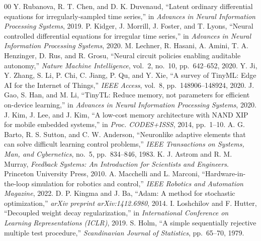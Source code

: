 \documentclass[conference]{IEEEtran}
\begin{document}
\begin{thebibliography}{00}
 Y. Rubanova, R. T. Chen, and D. K. Duvenaud, ``Latent ordinary differential equations for irregularly-sampled time series,'' in \textit{Advances in Neural Information Processing Systems}, 2019.
 P. Kidger, J. Morrill, J. Foster, and T. Lyons, ``Neural controlled differential equations for irregular time series,'' in \textit{Advances in Neural Information Processing Systems}, 2020.
 M. Lechner, R. Hasani, A. Amini, T. A. Henzinger, D. Rus, and R. Grosu, ``Neural circuit policies enabling auditable autonomy,'' \textit{Nature Machine Intelligence}, vol.~2, no.~10, pp.~642--652, 2020.
 Y. Ji, Y. Zhang, S. Li, P. Chi, C. Jiang, P. Qu, and Y. Xie, ``A survey of TinyML: Edge AI for the Internet of Things,'' \textit{IEEE Access}, vol.~8, pp.~148906--148924, 2020.
 J. Gao, S. Han, and M. Li, ``TinyTL: Reduce memory, not parameters for efficient on-device learning,'' in \textit{Advances in Neural Information Processing Systems}, 2020.
 J. Kim, J. Lee, and J. Kim, ``A low-cost memory architecture with NAND XIP for mobile embedded systems,'' in \textit{Proc. CODES+ISSS}, 2014, pp.~1--10.
 A. G. Barto, R. S. Sutton, and C. W. Anderson, ``Neuronlike adaptive elements that can solve difficult learning control problems,'' \textit{IEEE Transactions on Systems, Man, and Cybernetics}, no.~5, pp.~834--846, 1983.
 K. J. Astrom and R. M. Murray, \textit{Feedback Systems: An Introduction for Scientists and Engineers}. Princeton University Press, 2010.
 A. Macchelli and L. Marconi, ``Hardware-in-the-loop simulation for robotics and control,'' \textit{IEEE Robotics and Automation Magazine}, 2022.
 D. P. Kingma and J. Ba, ``Adam: A method for stochastic optimization,'' \textit{arXiv preprint arXiv:1412.6980}, 2014.
 I. Loshchilov and F. Hutter, ``Decoupled weight decay regularization,'' in \textit{International Conference on Learning Representations (ICLR)}, 2019.
 S. Holm, ``A simple sequentially rejective multiple test procedure,'' \textit{Scandinavian Journal of Statistics}, pp.~65--70, 1979.
\end{thebibliography}
\end{document}
